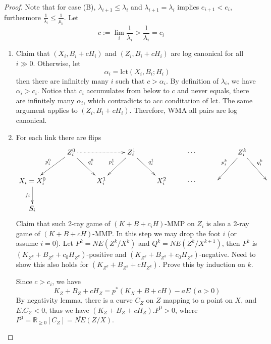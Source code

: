 \documentclass{article}
\begin{document}
\begin{proof}
Note that for case (B), $ \lambda_{i+1}\leqslant \lambda_i $ and $ \lambda_{i+1}=\lambda_i $ implies $ e_{i+1}<e_i $, furthermore $ \frac{1}{\lambda_i}\leqslant \frac{1}{\mu_0} $. Let
$$ c:=\lim_{i}\frac{1}{\lambda_i}>\frac{1}{\lambda_i}=c_i $$
\begin{enumerate}[Step 1]
\item Claim that $ (X_i,B_i+cH_i) $ and $ (Z_i,B_i+cH_i) $ are log canonical for all $ i\gg 0 $. Otherwise, let
$$ \alpha_i=\mathrm{lct}(X_i,B_i;H_i) $$
then there are infinitely many $ i $ such that $ c>\alpha_i $. By definition of $ \lambda_i $, we have $ \alpha_i>c_i $. Notice that $ c_i $ accumulates from below to $ c $ and never equals, there are infinitely many $ \alpha_i $, which contradicts to acc conditation of lct. The same argument applies to $ (Z_i,B_i+cH_i) $. Therefore, WMA all pairs are log canonical.
\item For each link there are flips
$$ \xymatrix{
&Z_i^0\ar[ld]_{p^0_i}\ar[dr]^{q^0_i}\ar@{.>}[rr]&&Z_i^1\ar[ld]_{p^1_i}\ar[rd]^{q^1_i}&&\cdots&&Z_i^k\ar[ld]_{p^k_i}\ar[dr]^{q^k_i}\\
X_i=X^0_i\ar[d]_{f_i} &&X^1_i&&X_i^2&\cdots&&&\\
S_i }$$
Claim that such 2-ray game of $ (K+B+c_iH) $-MMP on $ Z_i $ is also a 2-ray game of $ (K+B+cH) $-MMP. In this step we may drop the foot $ i $ (or assume $ i=0 $). Let $ P^k=\overline{NE}(Z^k/X^k) $ and $ Q^k=\overline{NE}(Z^k/X^{k+1}) $, then $ P^k $ is $ (K_{Z^k}+B_{Z^k}+c_0H_{Z^k}) $-positive and $ (K_{Z^k}+B_{Z^k}+c_0H_{Z^k}) $-negative. Need to show this also holds for $ (K_{Z^k}+B_{Z^k}+cH_{Z^k}) $. Prove this by induction on $ k $.

Since $ c>c_i $, we have
$$ K_Z+B_Z+cH_Z=p^*(K_X+B+cH)-aE\,(a>0) $$
By negativity lemma, there is a curve $ C_Z $ on $ Z $ mapping to a point on $ X $, and $ E.C_Z<0 $, thus we have $ (K_Z+B_Z+cH_Z).P^0>0 $, where $ P^0=\mathbb{R}_{\geqslant0}[C_Z]=\overline{NE}(Z/X) $.


\end{enumerate}
\end{proof}
\end{document}
